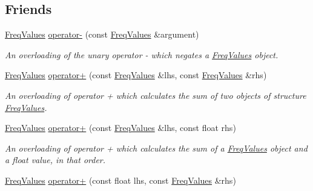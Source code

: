 \subsection*{Friends}
\begin{DoxyCompactItemize}
\item 
\mbox{\label{structFreqValues_af2d38eb1ad1d3c6dfab8b4ea399c867d}} 
\hyperlink{structFreqValues}{Freq\+Values} \hyperlink{structFreqValues_af2d38eb1ad1d3c6dfab8b4ea399c867d}{operator-\/} (const \hyperlink{structFreqValues}{Freq\+Values} \&argument)
\begin{DoxyCompactList}\small\item\em An overloading of the unary operator -\/ which negates a {\itshape \hyperlink{structFreqValues}{Freq\+Values}} object. \end{DoxyCompactList}\item 
\mbox{\label{structFreqValues_aa27b2370e9b314e6e0f308f4efb39a2f}} 
\hyperlink{structFreqValues}{Freq\+Values} \hyperlink{structFreqValues_aa27b2370e9b314e6e0f308f4efb39a2f}{operator+} (const \hyperlink{structFreqValues}{Freq\+Values} \&lhs, const \hyperlink{structFreqValues}{Freq\+Values} \&rhs)
\begin{DoxyCompactList}\small\item\em An overloading of operator + which calculates the sum of two objects of structure {\itshape \hyperlink{structFreqValues}{Freq\+Values}}. \end{DoxyCompactList}\item 
\mbox{\label{structFreqValues_afa29d8e6cf56d1c724c712bcc95c0e4b}} 
\hyperlink{structFreqValues}{Freq\+Values} \hyperlink{structFreqValues_afa29d8e6cf56d1c724c712bcc95c0e4b}{operator+} (const \hyperlink{structFreqValues}{Freq\+Values} \&lhs, const float rhs)
\begin{DoxyCompactList}\small\item\em An overloading of operator + which calculates the sum of a {\itshape \hyperlink{structFreqValues}{Freq\+Values}} object and a {\itshape float} value, in that order. \end{DoxyCompactList}\item 
\mbox{\label{structFreqValues_add1a78bbae864d4a24ac7b491ae41b2e}} 
\hyperlink{structFreqValues}{Freq\+Values} \hyperlink{structFreqValues_add1a78bbae864d4a24ac7b491ae41b2e}{operator+} (const float lhs, const \hyperlink{structFreqValues}{Freq\+Values} \&rhs)

\end{DoxyCompactItemize}
